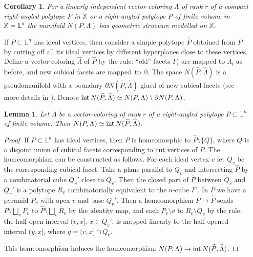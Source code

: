 \documentclass[12pt]{amsart}
\newtheorem{corollary}[formula]{Corollary}
\newtheorem{lemma}[formula]{Lemma}
\theoremstyle{definition}
\theoremstyle{remark}
\begin{document}
\begin{corollary}
For a linearly independent vector-coloring 
$\Lambda$ of rank $r$ of a compact right-angled polytope $P$ in $\mathbb X$ or a right-angled polytope $P$ of finite volume in 
$\mathbb X=\mathbb L^n$ the manifold $N(P,\Lambda)$ has geometric structure modelled on $\mathbb X$. 
\end{corollary}

If $P\subset \mathbb L^n$ has ideal vertices, then
consider a simple polytope $\widehat{P}$ obtained from $P$ by cutting off all its ideal vertices by different hyperplanes close to these vertices. Define a vector-coloring $\widehat{\Lambda}$ of $\widehat{P}$ by the rule: ``old'' facets $F_i$ are mapped to $\Lambda_i$ as before, and new cubical facets are mapped~to~$0$.
The space $N(\widehat P,\widehat{\Lambda})$ is a pseudomanifold with a boundary $\partial N(\widehat P,\widehat{\Lambda})$ 
glued of new cubical facets (see more details in \cite{E24}). Denote 
${\rm int}\,N(\widehat P,\widehat{\Lambda})\simeq N(P,\Lambda)\setminus \partial N(P,\Lambda)$.
\begin{lemma}\label{Rcusp}
Let $\Lambda$ be a vector-coloring of rank $r$ of a right-angled polytope $P\subset\mathbb L^n$
of finite volume. Then $N(P,\Lambda)\simeq {\rm int}\,N(\widehat P,\widehat{\Lambda})$.
\end{lemma}
\begin{proof}


If $P\subset \mathbb L^n$ has ideal vertices, then $P$ is homeomorphic to $\widehat{P}\setminus\{Q\}$,
where $Q$ is a disjoint union of cubical facets corresponding to cut vertices of $P$. The homeomorphism
can be constructed as follows. For each ideal vertex $v$ let $Q_v$ be the corresponding cubical facet.
Take a plane parallel to $Q_v$ and intersecting $\widehat{P}$ by a combinatorial cube $Q_v'$ close to $Q_v$.
Then the closed part of $\widehat{P}$ between $Q_v$ and $Q_v'$ is a polytope $R_v$ combinatorially equivalent to the $n$-cube
$I^n$. In $P$ we have a pyramid $P_v$ with apex $v$ and base $Q_v'$. Then a homeomorphism $P\to \widehat{P}$
sends $P\setminus\bigsqcup_v P_v$ to  $\widehat{P}\setminus\bigsqcup_v R_v$ by the identity map, and
each $P_v\setminus v$ to $R_v\setminus Q_v$ by the rule: the half-open interval $(v,x]$, $x\in Q_v'$, is mapped linearly
to the half-opened interval $(y,x]$, where $y=(v,x]\cap Q_v$.

This homeomorphism induces the homeomorphism $N(P,\Lambda)\to {\rm int}\,N(\widehat P,\widehat{\Lambda})$.


\end{proof}
\end{document}
